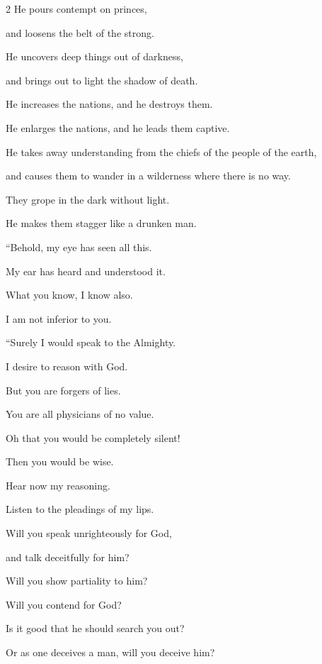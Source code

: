 \begin{multicols}{2}
	\myverse{}He pours contempt on princes,
	
	and loosens the belt of the strong.
	
	\myverse{}He uncovers deep things out of darkness,
	
	and brings out to light the shadow of death.
	
	\myverse{}He increases the nations, and he destroys them.
	
	He enlarges the nations, and he leads them captive.
	
	\myverse{}He takes away understanding from the chiefs of the people of
	the earth,
	
	and causes them to wander in a wilderness where there is no way.
	
	\myverse{}They grope in the dark without light.
	
	He makes them stagger like a drunken man.
	
	
	
	
	\mychapter{} \myverse*{}“Behold, my eye has seen all this.
	
	\quad\quad My ear has heard and understood it.
	
	\myverse{}What you know, I know also.
	
	I am not inferior to you.
	
	\vspace{\baselineskip}
	
	\myverse{}“Surely I would speak to the Almighty.
	
	\quad\quad I desire to reason with God.
	
	\myverse{}But you are forgers of lies.
	
	You are all physicians of no value.
	
	\myverse{}Oh that you would be completely silent!
	
	Then you would be wise.
	
	\myverse{}Hear now my reasoning.
	
	Listen to the pleadings of my lips.
	
	\myverse{}Will you speak unrighteously for God,
	
	and talk deceitfully for him?
	
	\myverse{}Will you show partiality to him?
	
	Will you contend for God?
	
	\myverse{}Is it good that he should search you out?
	
	Or as one deceives a man, will you deceive him?
	

\end{multicols}
